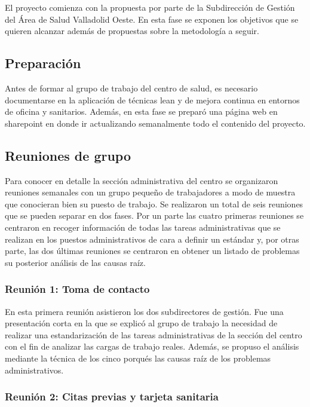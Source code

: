 El proyecto comienza con la propuesta por parte de la Subdirección de Gestión del Área de Salud Valladolid Oeste. En esta fase se exponen los objetivos que se quieren alcanzar además de propuestas sobre la metodología a seguir.

\subsection{Preparación}

Antes de formar al grupo de trabajo del centro de salud, es necesario documentarse en la aplicación de técnicas lean y de mejora continua en entornos de oficina y sanitarios. Además, en esta fase se preparó una página web en \Gls{sharepoint} en donde ir actualizando semanalmente todo el contenido del proyecto.

\subsection{Reuniones de grupo}

Para conocer en detalle la sección administrativa del centro se organizaron reuniones semanales con un grupo pequeño de trabajadores a modo de muestra que conocieran bien su puesto de trabajo.
Se realizaron un total de seis reuniones que se pueden separar en dos fases.
Por un parte las cuatro primeras reuniones se centraron en recoger información de todas las tareas administrativas que se realizan en los puestos administrativos de cara a definir un estándar y, por otras parte, las dos últimas reuniones se centraron en obtener un listado de problemas su posterior análisis de las causas raíz.

\subsubsection{Reunión 1: Toma de contacto}

En esta primera reunión asistieron los dos subdirectores de gestión. Fue una presentación corta en la que se explicó al grupo de trabajo la necesidad de realizar una estandarización de las tareas administrativas de la sección del centro con el fin de analizar las cargas de trabajo reales. Además, se propuso el análisis mediante la técnica de los cinco porqués las causas raíz de los problemas administrativos.

\subsubsection{Reunión 2: Citas previas y tarjeta sanitaria}

